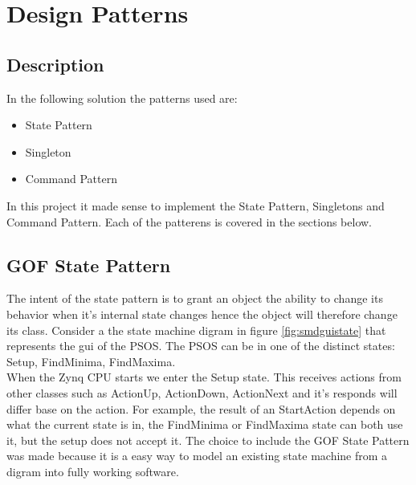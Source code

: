 \section{Design Patterns} \label{designpatterns}

\subsection{Description}

\noindent{}

In the following solution the patterns   used are:
\begin{itemize}
	\item State Pattern
	\item Singleton
	\item Command Pattern
\end{itemize}

In this project it made sense to implement the State Pattern, Singletons and Command Pattern. Each of the patterens is covered in the sections below.

\subsection{GOF State Pattern}
The intent of the state pattern is to grant an object the ability to change its behavior when it's internal state changes hence the object will therefore change its class. Consider a the state machine digram in figure \ref{fig:smdguistate} that represents the gui of the PSOS. The PSOS can be in one of the distinct states: Setup, FindMinima, FindMaxima. \\

When the Zynq CPU starts we enter the Setup state. This receives actions from other classes such as ActionUp, ActionDown, ActionNext and it's responds will differ base on the action. For example, the result of an StartAction depends on what the current state is in, the FindMinima or FindMaxima state can both use it, but the setup does not accept it. The choice to include the GOF State Pattern was made because it is a easy way to model an existing state machine from a digram into fully working software. \\

